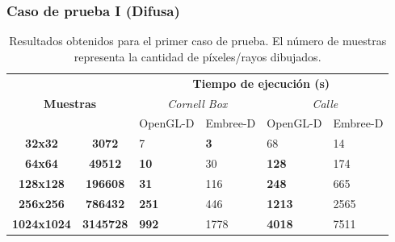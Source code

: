 \subsubsection{Caso de prueba I (Difusa)}

\begin{table}[htbp]
	\centering
	\begin{tabular}{|c|c|l|l||l|l|}
		\hline
		\multicolumn{2}{|c|}{\multirow{3}{*}{\textbf{Muestras}}} & \multicolumn{4}{c|}{\textbf{Tiempo de ejecución (s)}}                                                                                  \\ \cline{3-6} 
		\multicolumn{2}{|c|}{}                   & \multicolumn{2}{c||}{\textit{Cornell Box}}                 & \multicolumn{2}{c|}{\textit{Calle}}                      \\ \cline{3-6}
		\multicolumn{2}{|c|}{}
		& \multicolumn{1}{c|}{OpenGL-D} & \multicolumn{1}{c||}{Embree-D} & \multicolumn{1}{c|}{OpenGL-D} & \multicolumn{1}{c|}{Embree-D} \\ \hline
		\textbf{32x32}                        &
		\textbf{3072}                        & 7                           & \textbf{3}                           & 68                          & 14                          \\ \hline
		\textbf{64x64}                        &
		\textbf{49512}                       & \textbf{10}                          & 30                          & \textbf{128}                         & 174                         \\ \hline
		\textbf{128x128}                        &
		\textbf{196608}                       & \textbf{31}                          & 116                         & \textbf{248}                         & 665                         \\ \hline
		\textbf{256x256}                        &
		\textbf{786432}   & \textbf{251}                         & 446                         & \textbf{1213}                        & 2565                        \\ \hline
		\textbf{1024x1024}                        &
		\textbf{3145728}                      & \textbf{992}                         & 1778                        & \textbf{4018}                        & 7511                        \\ \hline
	\end{tabular}
	\caption{Resultados obtenidos para el primer caso de prueba. El número de muestras representa la cantidad de píxeles/rayos dibujados.}
	\label{tab:tablecaso1}
\end{table}

